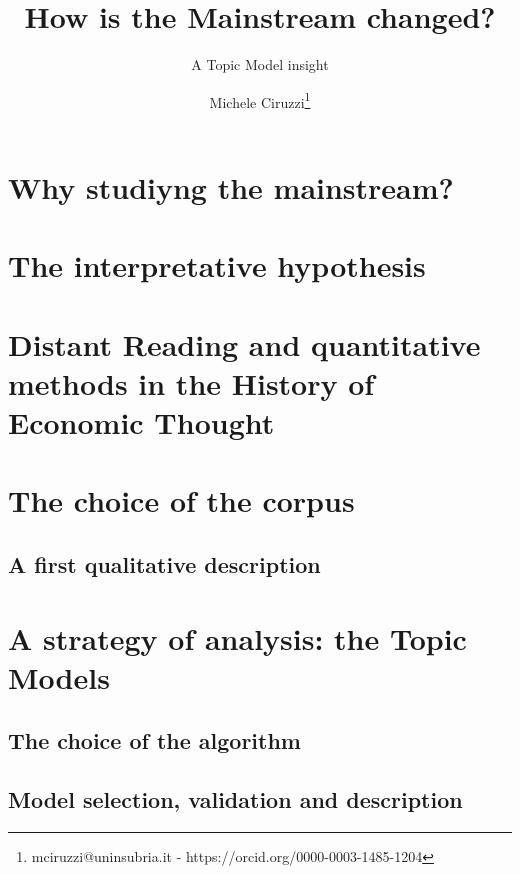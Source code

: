\documentclass[a4paper, headings=standardclasses]{scrartcl}
\title{How is the Mainstream changed? \let\thefootnote\relax\footnotetext{This is footnote}}
\subtitle{A Topic Model insight}
\author{Michele Ciruzzi\thanks{mciruzzi@uninsubria.it - https://orcid.org/0000-0003-1485-1204}}
\begin{document}
	
	\maketitle
	

  \section{Why studiyng the mainstream?}

  \section{The interpretative hypothesis}

  \section{Distant Reading and quantitative methods in the History of Economic Thought}

  \section{The choice of the corpus}
  
  \subsection{A first qualitative description}

  \section{A strategy of analysis: the Topic Models}
  
  \subsection{The choice of the algorithm}

  \subsection{Model selection, validation and description}
\end{document}
